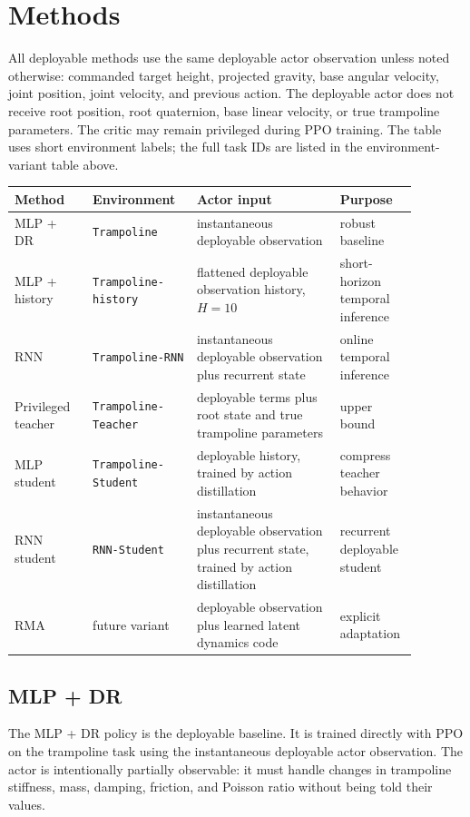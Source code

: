 \documentclass[11pt, a4paper]{article}
\begin{document}
\section{Methods}

All deployable methods use the same deployable actor observation unless noted
otherwise: commanded target height, projected gravity, base angular velocity,
joint position, joint velocity, and previous action. The deployable actor does
not receive root position, root quaternion, base linear velocity, or true
trampoline parameters. The critic may remain privileged during PPO training.
The table uses short environment labels; the full task IDs are listed in the
environment-variant table above.

\begin{center}
\small
\begin{tabular}{@{}p{0.18\linewidth}p{0.24\linewidth}p{0.33\linewidth}p{0.13\linewidth}@{}}
\hline
Method & Environment & Actor input & Purpose \\
\hline
MLP + DR &
\texttt{Trampoline} &
instantaneous deployable observation &
robust baseline \\
MLP + history &
\texttt{Trampoline-history} &
flattened deployable observation history, $H=10$ &
short-horizon temporal inference \\
RNN &
\texttt{Trampoline-RNN} &
instantaneous deployable observation plus recurrent state &
online temporal inference \\
Privileged teacher &
\texttt{Trampoline-Teacher} &
deployable terms plus root state and true trampoline parameters &
upper bound \\
MLP student &
\texttt{Trampoline-Student} &
deployable history, trained by action distillation &
compress teacher behavior \\
RNN student &
\texttt{RNN-Student} &
instantaneous deployable observation plus recurrent state, trained by action
distillation &
recurrent deployable student \\
RMA &
future variant &
deployable observation plus learned latent dynamics code &
explicit adaptation \\
\hline
\end{tabular}
\end{center}

\subsection{MLP + DR}

The MLP + DR policy is the deployable baseline. It is trained directly with PPO
on the trampoline task using the instantaneous deployable actor observation.
The actor is intentionally partially observable: it must handle changes in
trampoline stiffness, mass, damping, friction, and Poisson ratio without being
told their values.
\end{document}
